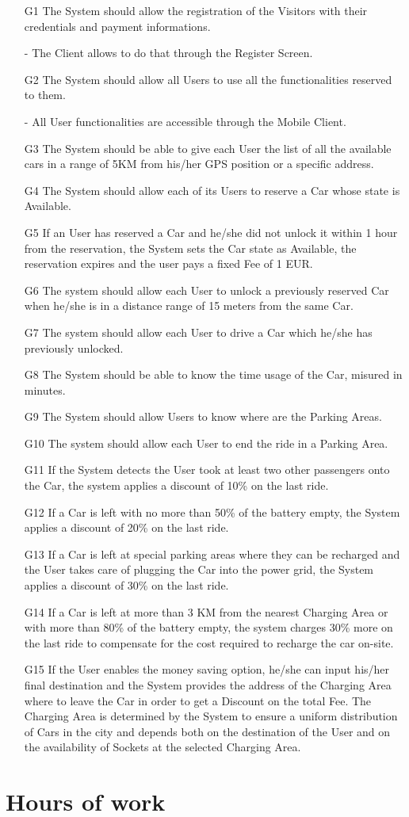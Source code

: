 \documentclass[12pt]{article}
\begin{document}
\begin{enumerate}
	\item[G1] The System should allow the registration of the Visitors with their credentials and payment informations.
	\item[-] The Client allows to do that through the Register Screen.
	\item[G2] The System should allow all Users to use all the functionalities reserved to them.
	\item[-] All User functionalities are accessible through the Mobile Client.
	\item[G3] The System should be able to give each User the list of all the available cars in a range of 5KM from his/her GPS position or a specific address.
	\item[G4] The System should allow each of its Users to reserve a Car whose state is Available.
	\item[G5] If an User has reserved a Car and he/she did not unlock it within 1 hour from the reservation, the System sets the Car state as Available, the reservation expires and the user pays a fixed Fee of 1 EUR.  
	\item[G6] The system should allow each User to unlock a previously reserved Car when he/she is in a distance range of 15 meters from the same Car.
	\item[G7] The system should allow each User to drive a Car which he/she has previously unlocked.
	\item[G8] The System should be able to know the time usage of the Car, misured in minutes.
	\item[G9] The System should allow Users to know where are the Parking Areas.
	\item[G10] The system should allow each User to end the ride in a Parking Area.
	\item[G11] If the System detects the User took at least two other passengers onto the Car, the system applies a discount of 10\% on the last ride. 
	\item[G12] If a Car is left with no more than 50\% of the battery empty, the System applies a discount of 20\% on the last ride. 
	\item[G13] If a Car is left at special parking areas where they can be recharged and the User takes care of plugging the Car into the power grid, the System applies a discount of 30\% on the last ride. 
	\item[G14] If a Car is left at more than 3 KM from the nearest Charging Area or with more than 80\% of the battery empty, the system charges 30\% more on the last ride to compensate for the cost required to recharge the car on-site.
	\item[G15] If the User enables the money saving option, he/she can input his/her final destination and the System provides the address of the Charging Area where to leave the Car in order to get a Discount on the total Fee. The Charging Area is determined by the System to ensure a uniform distribution of Cars in the city and depends both on the destination of the User and on the availability of Sockets at the selected Charging Area. 
\end{enumerate}

\clearpage
\section{Hours of work}
\end{document}
